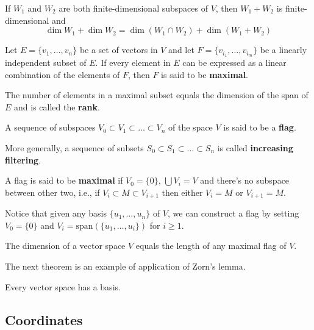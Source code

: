 \begin{theorem}
	If $W_1$ and $W_2$ are both finite-dimensional subspaces of $V$, then $W_1 + W_2$ is finite-dimensional and 
	\[
	    \dim W_1 + \dim W_2 = \dim (W_1 \cap W_2) + \dim (W_1 + W_2)
	\]
\end{theorem}

\begin{definition}[Maximal]\label{def:maximal}
	Let $E = \{ v_1, \ldots, v_n \}$ be a set of vectors in $V$ and let $F = \{ v_{i_1}, \ldots, v_{i_m} \}$ be a linearly independent subset of $E$. If every element in $E$ can be expressed as a linear combination of the elements of $F$, then $F$ is said to be \textbf{maximal}.
\end{definition}

The number of elements in a maximal subset equals the dimension of the span of $E$ and is called the \textbf{rank}.

\begin{definition}[Flags]
	A sequence of subspaces $V_0 \subset V_1 \subset \ldots \subset V_n$ of the space $V$ is said to be a \textbf{flag}.

	More generally, a sequence of subsets $S_0 \subset S_1 \subset \ldots \subset S_n$ is called \textbf{increasing filtering}.

	A flag is said to be \textbf{maximal} if $V_0 = \{ 0 \}$, $\bigcup V_i = V$ and there's no subspace between other two, i.e., if $V_i \subset M \subset V_{i+1}$ then either $V_i = M$ or $V_{i+1} = M$. 
\end{definition}

Notice that given any basis $\{ u_1, \ldots, u_n \}$ of $V$, we can construct a flag by setting $V_0 = \{ 0 \}$ and $V_i = \text{span}(\{ u_1, \ldots, u_i \})$ for $i \geq 1$.

\begin{theorem}
	The dimension of a vector space $V$ equals the length of any maximal flag of $V$.
\end{theorem}

The next theorem is an example of application of Zorn's lemma.

\begin{theorem}
	Every vector space has a basis.
\end{theorem}

\subsection{Coordinates}

